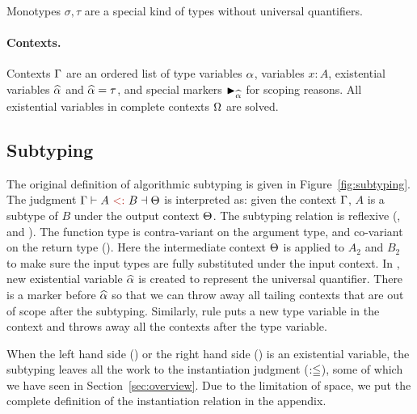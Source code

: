 Monotypes $\sigma, \tau$ are a special kind of types without universal
quantifiers.

\paragraph{Contexts.}
Contexts $\Gamma$ are an ordered list of type variables $\alpha$, variables $x:
A$, existential variables $\widehat{\alpha}$ and $\widehat{\alpha} = \tau$, and special markers
$\blacktriangleright_{\widehat{\alpha}}$ for scoping reasons.
All existential variables in complete contexts $\Omega$ are solved.


\subsection{Subtyping}

\begin{figure*}[t]
  \caption{Algorithmic Subtyping (Original).}
  \label{fig:subtyping}
\end{figure*}

The original definition of algorithmic subtyping is given in
Figure~\ref{fig:subtyping}. The judgment $\tctx \bysub A \tsub B \toctx$ is
interpreted as: given the context $\Gamma$, $A$ is a subtype of $B$ under the
output context $\Theta$.
The subtyping relation is reflexive (,  and
). The function type is contra-variant on the argument type,
and co-variant on the return type (\rul{$\to$}). Here the intermediate context
$\Theta$ is applied to $A_2$ and $B_2$ to make sure the input types are fully
substituted under the input context. In , new existential
variable $\widehat{\alpha}$ is created to represent the universal quantifier. There is a
marker before $\widehat{\alpha}$ so that we can throw away all tailing contexts that are
out of scope after the subtyping. Similarly, rule  puts a
new type variable in the context and throws away all the contexts after the type variable.

When the left hand side () or the right hand side () is an
existential variable, the subtyping leaves all the work to the instantiation
judgment ($:\leqq$), some of which we have seen in Section~\ref{sec:overview}. Due
to the limitation of space, we put the complete definition of the instantiation
relation in the appendix.

